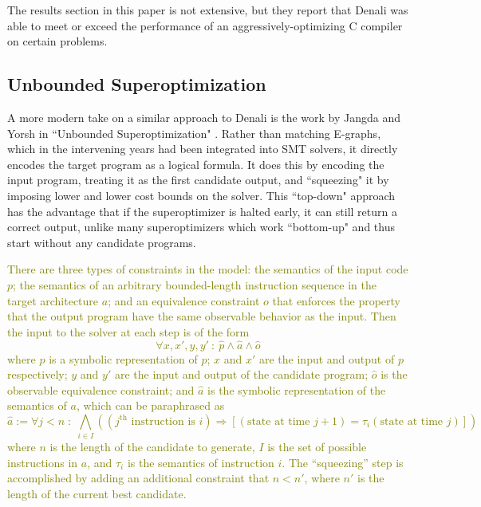 \documentclass[12pt,twoside]{reedthesis}
\newcommand{\green}[1]{\textcolor{olive}{#1}}
\begin{document}
            The results section in this paper is not extensive, but they report that Denali was able to meet or exceed the performance of an aggressively-optimizing C compiler on certain problems.

        \subsection{Unbounded Superoptimization}
            A more modern take on a similar approach to Denali is the work by Jangda and Yorsh in ``Unbounded Superoptimization" \cite{jangda2017unbounded}.
            Rather than matching E-graphs, which in the intervening years had been integrated into SMT solvers, it directly encodes the target program as a logical formula.
            It does this by encoding the input program, treating it as the first candidate output, and ``squeezing" it by imposing lower and lower cost bounds on the solver.
            This ``top-down" approach has the advantage that if the superoptimizer is halted early, it can still return a correct output, unlike many superoptimizers which work ``bottom-up" and thus start without any candidate programs.

            \green{
            There are three types of constraints in the model:
                the semantics of the input code $p$;
                the semantics of an arbitrary bounded-length instruction sequence in the target architecture $a$;
                and an equivalence constraint $o$ that enforces the property that the output program have the same observable behavior as the input.
            Then the input to the solver at each step is of the form 
            \[
                \forall x, x', y, y' ~:~ \hat{p} \wedge \hat{a} \wedge \hat{o}
            \]
                where $\hat{p}$ is a symbolic representation of $p$;
                $x$ and $x'$ are the input and output of $p$ respectively;
                $y$ and $y'$ are the input and output of the candidate program;
                $\hat{o}$ is the observable equivalence constraint;
                and $\hat{a}$ is the symbolic representation of the semantics of $a$, which can be paraphrased as 
            \[
                \hat{a} := \forall j < n \;:\; \bigwedge_{i \in I} \left((j^\text{th} \text{ instruction is } i) \Rightarrow [(\text{state at time } j + 1) = \tau_i(\text{state at time }j)]\right)
            \]
            where $n$ is the length of the candidate to generate, $I$ is the set of possible instructions in $a$, and $\tau_i$ is the semantics of instruction $i$.
            The ``squeezing'' step is accomplished by adding an additional constraint that $n < n'$, where $n'$ is the length of the current best candidate.
            }
            
\end{document}
